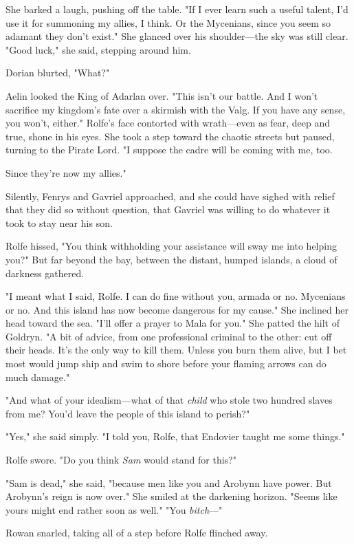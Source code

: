 She barked a laugh, pushing off the table.
"If I ever learn such a useful talent, I'd use it for summoning my allies, I think.
Or the Mycenians, since you seem so adamant they don't exist."
She glanced over his shoulder---the sky was still clear.
"Good luck," she said, stepping around him.

Dorian blurted, "What?"

Aelin looked the King of Adarlan over.
"This isn't our battle.
And I won't sacrifice my kingdom's fate over a skirmish with the Valg.
If you have any sense, you won't, either."
Rolfe's face contorted with wrath---even as fear, deep and true, shone in his eyes.
She took a step toward the chaotic streets but paused, turning to the Pirate Lord.
"I suppose the cadre will be coming with me, too.

Since they're now my allies."

Silently, Fenrys and Gavriel approached, and she could have sighed with relief that they did so without question, that Gavriel was willing to do whatever it took to stay near his son.

Rolfe hissed, "You think withholding your assistance will sway me into helping you?"
But far beyond the bay, between the distant, humped islands, a cloud of darkness gathered.

"I meant what I said, Rolfe.
I can do fine without you, armada or no.
Mycenians or no.
And this island has now become dangerous for my cause."
She inclined her head toward the sea.
"I'll offer a prayer to Mala for you."
She patted the hilt of Goldryn.
"A bit of advice, from one professional criminal to the other: cut off their heads.
It's the only way to kill them.
Unless you burn them alive, but I bet most would jump ship and swim to shore before your flaming arrows can do much damage."

"And what of your idealism---what of that \emph{child} who stole two hundred slaves from me?
You'd leave the people of this island to perish?"

"Yes," she said simply.
"I told you, Rolfe, that Endovier taught me some things."

Rolfe swore.
"Do you think \emph{Sam} would stand for this?"

"Sam is dead," she said, "because men like you and Arobynn have power.
But Arobynn's reign is now over."
She smiled at the darkening horizon.
"Seems like yours might end rather soon as well."
"You \emph{bitch}---"

Rowan snarled, taking all of a step before Rolfe flinched away.

